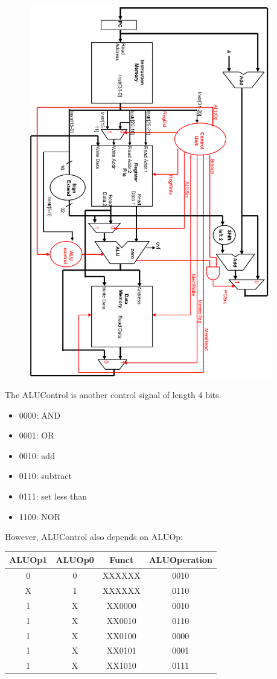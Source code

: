 \documentclass[12pt]{article}
\theoremstyle{definition}
\begin{document}
\begin{figure}[h]
\centering
\includegraphics[width = 0.95\textwidth]{12_7.png}
\end{figure}
\clearpage
The ALUControl is another control signal of length 4 bits.
\begin{itemize}
  \item 0000: AND
  \item 0001: OR
  \item 0010: add
  \item 0110: subtract
  \item 0111: set less than
  \item 1100: NOR
\end{itemize}
However, ALUControl also depends on ALUOp:
\begin{table}[h]
\centering
\begin{tabular}{|c|c|c|c|}
\hline
ALUOp1&ALUOp0&Funct&ALUOperation\\\hline
0&0&XXXXXX&0010\\\hline
X&1&XXXXXX&0110\\\hline
1&X&XX0000&0010\\\hline
1&X&XX0010&0110\\\hline
1&X&XX0100&0000\\\hline
1&X&XX0101&0001\\\hline
1&X&XX1010&0111\\\hline
\end{tabular}
\end{table}












\clearpage

\end{document}
